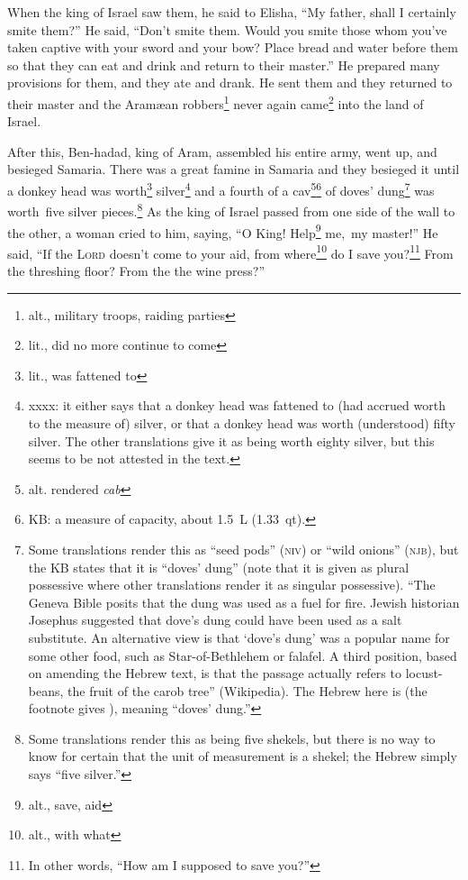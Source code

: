\begin{inparaenum}
     When the king of Israel saw them, he said to Elisha, ``My father, shall I certainly smite them?''%
     He said, ``Don't smite them. Would you smite those whom you've taken captive with your sword and your bow? Place bread and water before them so that they can eat and drink and return to their master.''%
     He prepared many provisions for them, and they ate and drank. He sent them and they returned to their master and the Aram\ae{}an robbers\footnote{alt., military troops, raiding parties} never again came\footnote{lit., did no more continue to come} into the land of Israel.%
    
     After this, Ben-hadad, king of Aram, assembled his entire army, went up, and besieged Samaria.%
     There was a great famine in Samaria and they besieged it until a donkey head was worth\footnote{lit., was fattened to} silver\footnote{xxxx: it either says that a donkey head was fattened to (had accrued worth to the measure of) silver, or that a donkey head was worth (understood) fifty silver. The other translations give it as being worth eighty silver, but this seems to be not attested in the text.} and a fourth of a cav\footnote{alt. rendered \textit{cab}}\footnote{KB: a measure of capacity, about 1.5~L (1.33~qt).} of doves' dung\footnote{Some translations render this as ``seed pods'' (\textsc{niv}) or ``wild onions'' (\textsc{njb}), but the KB states that it is ``doves' dung'' (note that it is given as plural possessive where other translations render it as singular possessive). ``The Geneva Bible posits that the dung was used as a fuel for fire. Jewish historian Josephus suggested that dove's dung could have been used as a salt substitute. An alternative view is that `dove's dung' was a popular name for some other food, such as Star-of-Bethlehem or falafel. A third position, based on amending the Hebrew text, is that the passage actually refers to locust-beans, the fruit of the carob tree'' (Wikipedia). The Hebrew here is  (the footnote gives ), meaning ``doves' dung.''} was worth\understood\ five silver pieces.\footnote{Some translations render this as being five shekels, but there is no way to know for certain that the unit of measurement is a shekel; the Hebrew simply says ``five silver.''}%
     As the king of Israel passed from one side of the wall to the other, a woman cried to him, saying, ``O King! Help\footnote{alt., save, aid} me,\understood\ my master!''%
     He said, ``If the \textsc{Lord} doesn't come to your aid, from where\footnote{alt., with what} do I save you?\footnote{In other words, ``How am I supposed to save you?''} From the threshing floor? From the the wine press?''%

\end{inparaenum}
